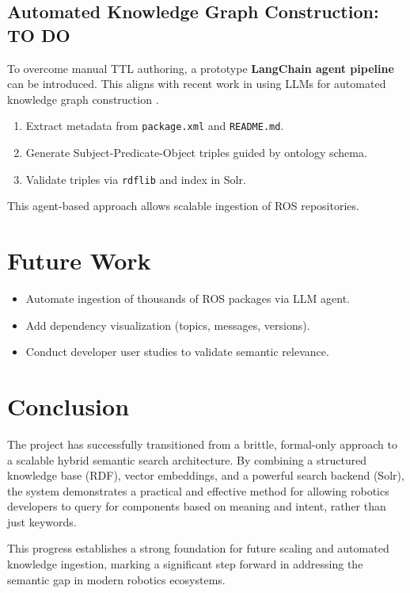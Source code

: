 \documentclass[rnd]{mas_proposal}
\begin{document}
\subsection{Automated Knowledge Graph Construction: TO DO}
To overcome manual TTL authoring, a prototype \textbf{LangChain agent pipeline} can be introduced. This aligns with recent work in using LLMs for automated knowledge graph construction \citep{geng2024survey}.
\begin{enumerate}
\item Extract metadata from \texttt{package.xml} and \texttt{README.md}.
\item Generate Subject-Predicate-Object triples guided by ontology schema.
\item Validate triples via \texttt{rdflib} and index in Solr.
\end{enumerate}

This agent-based approach allows scalable ingestion of ROS repositories.

\section{Future Work}
\begin{itemize}
\item Automate ingestion of thousands of ROS packages via LLM agent.
\item Add dependency visualization (topics, messages, versions).
\item Conduct developer user studies to validate semantic relevance.
\end{itemize}

\section{Conclusion}
The project has successfully transitioned from a brittle, formal-only approach to a scalable hybrid semantic search architecture. By combining a structured knowledge base (RDF), vector embeddings, and a powerful search backend (Solr), the system demonstrates a practical and effective method for allowing robotics developers to query for components based on meaning and intent, rather than just keywords.

This progress establishes a strong foundation for future scaling and automated knowledge ingestion, marking a significant step forward in addressing the semantic gap in modern robotics ecosystems.
\end{document}
